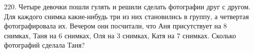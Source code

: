 220. Четыре девочки пошли гулять и решили сделать фотографии друг с другом. Для каждого снимка какие-нибудь три из них становились в группу, а четвертая фотографировала их. Вечером они посчитали, что Аня присутствует на 8 снимках, Таня на 6 снимках, Оля на 3 снимках, Катя на 7 снимках. Сколько фотографий сделала Таня?\\
